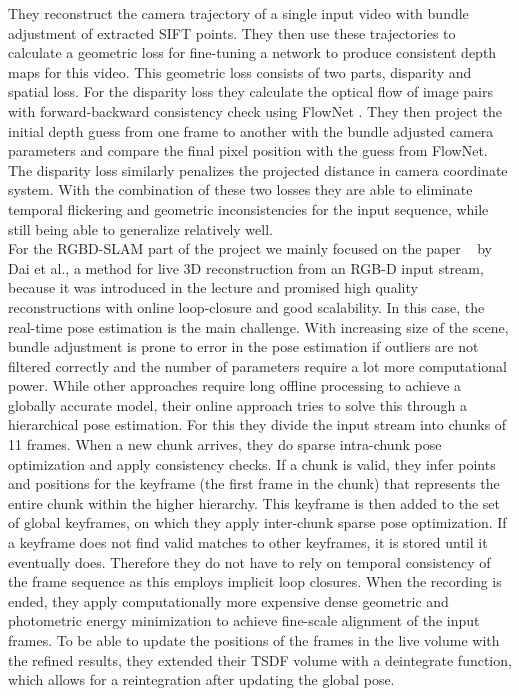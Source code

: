     They reconstruct the camera trajectory of a single input video with bundle adjustment of extracted SIFT points.
    They then use these trajectories to calculate a geometric loss for fine-tuning a network to produce consistent depth maps for this video.
    This geometric loss consists of two parts, disparity and spatial loss.
    For the disparity loss they calculate the optical flow of image pairs with forward-backward consistency check using FlowNet \cite{DFIB15}.
    They then project the initial depth guess from one frame to another with the bundle adjusted camera parameters and compare the final pixel position with the guess from FlowNet.
    The disparity loss similarly penalizes the projected distance in camera coordinate system.
    With the combination of these two losses they are able to eliminate temporal flickering and geometric inconsistencies for the input sequence, while still being able to generalize relatively well.\\
    \newpage
    \noindent For the RGBD-SLAM part of the project we mainly focused on the paper ~\cite{dai2017bundlefusion} by Dai et al., a method for live 3D reconstruction from an RGB-D input stream, because it was introduced in the lecture and promised high quality reconstructions with online loop-closure and good scalability.
    In this case, the real-time pose estimation is the main challenge.
    With increasing size of the scene, bundle adjustment is prone to error in the pose estimation if outliers are not filtered correctly and the number of parameters require a lot more computational power.
    While other approaches require long offline processing to achieve a globally accurate model, their online approach tries to solve this through a hierarchical pose estimation.
    For this they divide the input stream into chunks of 11 frames.
    When a new chunk arrives, they do sparse intra-chunk pose optimization and apply consistency checks.
    If a chunk is valid, they infer points and positions for the keyframe (the first frame in the chunk) that represents the entire chunk within the higher hierarchy.
    This keyframe is then added to the set of global keyframes, on which they apply inter-chunk sparse pose optimization.
    If a keyframe does not find valid matches to other keyframes, it is stored until it eventually does.
    Therefore they do not have to rely on temporal consistency of the frame sequence as this employs implicit loop closures.
    When the recording is ended, they apply computationally more expensive dense geometric and photometric energy minimization to achieve fine-scale alignment of the input frames.
    To be able to update the positions of the frames in the live volume with the refined results, they extended their TSDF volume with a deintegrate function, which allows for a reintegration after updating the global pose.